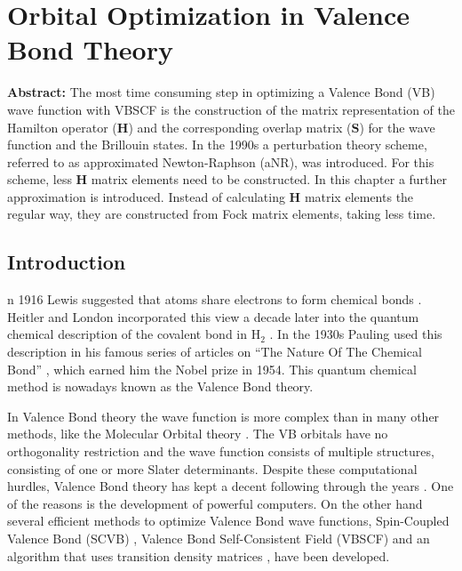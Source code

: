 \chapter{Orbital Optimization in Valence Bond Theory}
\label{chap_orbopt}


\noindent\textbf{Abstract:} The most time consuming step in optimizing a Valence Bond (VB) wave function with VBSCF is the construction of the matrix representation of the Hamilton operator ($\mathbf{H}$) and the corresponding overlap matrix ($\mathbf{S}$) for the wave function and the Brillouin states. In the 1990s a perturbation theory scheme, referred to as approximated Newton-Raphson (aNR), was introduced. For this scheme, less $\mathbf{H}$ matrix elements need to be constructed. In this chapter a further approximation is introduced. Instead of calculating $\mathbf{H}$ matrix elements the regular way, they are constructed from Fock matrix elements, taking less time.

\newpage

\section{Introduction}

\lettrine{}{}n 1916 Lewis suggested that atoms share electrons to form chemical bonds \cite{lewis}. Heitler and London incorporated this view a decade later into the quantum chemical description of the covalent bond in H$_2$ \cite{heitler}. In the 1930s Pauling used this description in his famous series of articles on ``The Nature Of The Chemical Bond'' \cite{pauling1,pauling2,pauling3,pauling4,pauling5,pauling6,pauling7,paulingbook}, which earned him the Nobel prize in 1954. This quantum chemical method is nowadays known as the Valence Bond theory.

In Valence Bond theory the wave function is more complex than in many other methods, like the Molecular Orbital theory \cite{hartree1,hartree2,hartree3,fock}. The VB orbitals have no orthogonality restriction and the wave function consists of multiple structures, consisting of one or more Slater determinants. Despite these computational hurdles, Valence Bond theory has kept a decent following through the years \cite{vboverv1,vboverv2,vboverv3}. One of the reasons is the development of powerful computers. On the other hand several efficient methods to optimize Valence Bond wave functions, Spin-Coupled Valence Bond (SCVB) \cite{scvb1,scvb2,scvb3}, Valence Bond Self-Consistent Field (VBSCF) \cite{vbscf1,vbscf2,koos1,zahid} and an algorithm that uses transition density matrices \cite{song}, have been developed.

